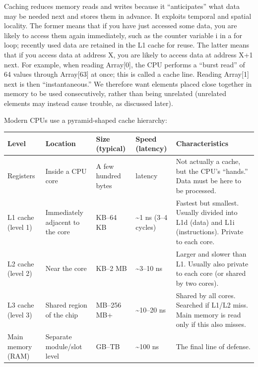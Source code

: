 Caching reduces memory reads and writes because it ``anticipates'' what data may be needed next and stores them in advance. It exploits temporal and spatial locality. The former means that if you have just accessed some data, you are likely to access them again immediately, such as the counter variable i in a for loop; recently used data are retained in the L1 cache for reuse. The latter means that if you access data at address X, you are likely to access data at address X+1 next. For example, when reading Array{[}0{]}, the CPU performs a ``burst read'' of 64 values through Array{[}63{]} at once; this is called a cache line. Reading Array{[}1{]} next is then ``instantaneous.'' We therefore want elements placed close together in memory to be used consecutively, rather than being unrelated (unrelated elements may instead cause trouble, as discussed later).

Modern CPUs use a pyramid-shaped cache hierarchy:

\begin{longtable}[]{@{}
  >{\raggedright\arraybackslash}p{}
  >{\raggedright\arraybackslash}p{}
  >{\raggedright\arraybackslash}p{}
  >{\raggedright\arraybackslash}p{}
  >{\raggedright\arraybackslash}p{}@{}}
\toprule
Level & Location & Size (typical) & Speed (latency) & Characteristics \\
\midrule
\endhead
Registers & Inside a CPU core & A few hundred bytes & 0 latency & Not actually a cache, but the CPU's ``hands.'' Data must be here to be processed. \\
L1 cache (level 1) & Immediately adjacent to the core & 32 KB--64 KB & \textasciitilde1 ns (3--4 cycles) & Fastest but smallest. Usually divided into L1d (data) and L1i (instructions). Private to each core. \\
L2 cache (level 2) & Near the core & 256 KB--2 MB & \textasciitilde3--10 ns & Larger and slower than L1. Usually also private to each core (or shared by two cores). \\
L3 cache (level 3) & Shared region of the chip & 4 MB--256 MB+ & \textasciitilde10--20 ns & Shared by all cores. Searched if L1/L2 miss. Main memory is read only if this also misses. \\
Main memory (RAM) & Separate module/slot level & 16 GB--TB & \textasciitilde100 ns & The final line of defense. \\
\bottomrule
\end{longtable}

